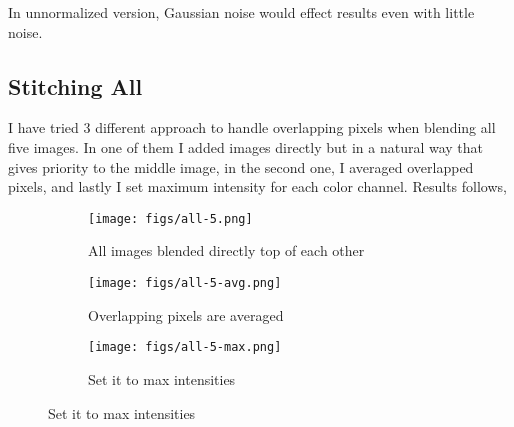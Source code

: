 \documentclass[12pt]{article}
\begin{document}
In unnormalized version, Gaussian noise would effect results even with little noise.

\subsection{Stitching All}

I have tried 3 different approach to handle overlapping pixels when blending all five images. In one of them I added images directly but in a natural way that gives priority to the middle image, in the second one, I averaged overlapped pixels, and lastly I set maximum intensity for each color channel. Results follows,

\begin{figure}[H]
    \centering
    \begin{subfigure}{\textwidth}
        \texttt{[image: figs/all-5.png]}
        \caption{All images blended directly top of each other}
        \label{fig:all}
    \end{subfigure}
    
    \begin{subfigure}{\textwidth}
        \texttt{[image: figs/all-5-avg.png]}
        \caption{Overlapping pixels are averaged}
        \label{fig:all-avg}
    \end{subfigure}
    
    \begin{subfigure}{\textwidth}
        \texttt{[image: figs/all-5-max.png]}
        \caption{Set it to max intensities}
        \label{fig:all-max}
    \end{subfigure}
\end{figure}
\end{document}
